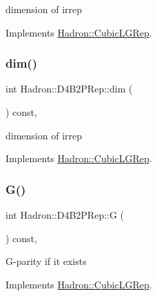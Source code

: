 dimension of irrep 

Implements \mbox{\hyperlink{structHadron_1_1CubicLGRep_a3acbaea26503ed64f20df693a48e4cdd}{Hadron\+::\+Cubic\+L\+G\+Rep}}.

\mbox{\label{structHadron_1_1D4B2PRep_a7618d0e6ba704200dac6e55ca799a815}} 
\subsubsection{\texorpdfstring{dim()}{dim()}\hspace{0.1cm}{\footnotesize\ttfamily [2/2]}}
{\footnotesize\ttfamily int Hadron\+::\+D4\+B2\+P\+Rep\+::dim (\begin{DoxyParamCaption}{ }\end{DoxyParamCaption}) const\hspace{0.3cm}{\ttfamily [inline]}, {\ttfamily [virtual]}}

dimension of irrep 

Implements \mbox{\hyperlink{structHadron_1_1CubicLGRep_a3acbaea26503ed64f20df693a48e4cdd}{Hadron\+::\+Cubic\+L\+G\+Rep}}.

\mbox{\label{structHadron_1_1D4B2PRep_a7a15814601dae2dfb46e08a9d1ff8900}} 
\subsubsection{\texorpdfstring{G()}{G()}\hspace{0.1cm}{\footnotesize\ttfamily [1/2]}}
{\footnotesize\ttfamily int Hadron\+::\+D4\+B2\+P\+Rep\+::G (\begin{DoxyParamCaption}{ }\end{DoxyParamCaption}) const\hspace{0.3cm}{\ttfamily [inline]}, {\ttfamily [virtual]}}

G-\/parity if it exists 

Implements \mbox{\hyperlink{structHadron_1_1CubicLGRep_ace26f7b2d55e3a668a14cb9026da5231}{Hadron\+::\+Cubic\+L\+G\+Rep}}.

\mbox{\label{structHadron_1_1D4B2PRep_a7a15814601dae2dfb46e08a9d1ff8900}} 
